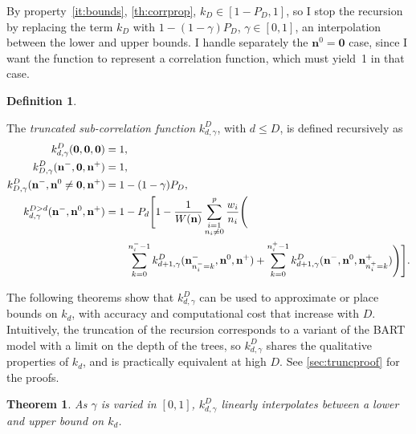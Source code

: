 \documentclass[a4paper]{article}
\newcommand{\nvecs}{\mathbf n^-, \mathbf n^0, \mathbf n^+}
\newtheorem{theorem}{Theorem}
\theoremstyle{definition}
\newtheorem{definition}{Definition}
\begin{document}
    By property~\ref{it:bounds}, \autoref{th:corrprop}, $k_D \in [1 - P_D, 1]$, so I stop the recursion by replacing the term $k_D$ with $1 - (1 - \gamma) P_D$, $\gamma \in [0, 1]$, an interpolation between the lower and upper bounds. I handle separately the $\mathbf n^0=\mathbf 0$ case, since I want the function to represent a correlation function, which must yield~1 in that case.

    \begin{definition}
        \label{def:truncorr}

        The \emph{truncated sub-correlation function} $k^D_{d,\gamma}$, with $d \le D$, is defined recursively as
        \begin{align}
            k^D_{d,\gamma}(\mathbf 0, \mathbf 0, \mathbf 0) &= 1, \\
            k^D_{D,\gamma}(\mathbf n^-, \mathbf 0, \mathbf n^+) &= 1, \label{eq:n0e0base} \\
            k^D_{D,\gamma}(\mathbf n^-, \mathbf n^0\ne \mathbf0, \mathbf n^+) &= 1 - (1 - \gamma) P_D, \label{eq:n0ne0base} \\
            k^{D>d}_{d,\gamma}(\nvecs) &= 1 - P_d \Bigg[1 - \frac1{W(\mathbf n)}
                \sum_{\substack{i=1 \\ n_i\ne 0}}^p \frac{w_i}{n_i} \Bigg( \notag \\
                    &\qquad \sum_{k=0}^{n^-_i - 1}
                    k^D_{d+1,\gamma}(\mathbf n^-_{n^-_i=k}, \mathbf n^0, \mathbf n^+)
                    + \sum_{k=0}^{n^+_i - 1}
                    k^D_{d+1,\gamma}(\mathbf n^-, \mathbf n^0, \mathbf n^+_{n^+_i=k})
                \Bigg)
            \Bigg]. \label{eq:truncorr}
        \end{align}

    \end{definition}

    The following theorems show that $k^D_{d,\gamma}$ can be used to approximate or place bounds on $k_d$, with accuracy and computational cost that increase with $D$. Intuitively, the truncation of the recursion corresponds to a variant of the BART model with a limit on the depth of the trees, so $k^D_{d,\gamma}$ shares the qualitative properties of $k_d$, and is practically equivalent at high $D$. See \autoref{sec:truncproof} for the proofs.

    \begin{theorem}
        As $\gamma$ is varied in $[0,1]$, $k^D_{d,\gamma}$ linearly interpolates between a lower and upper bound on $k_d$. \label{th:truncinterp}
    \end{theorem}
\end{document}
